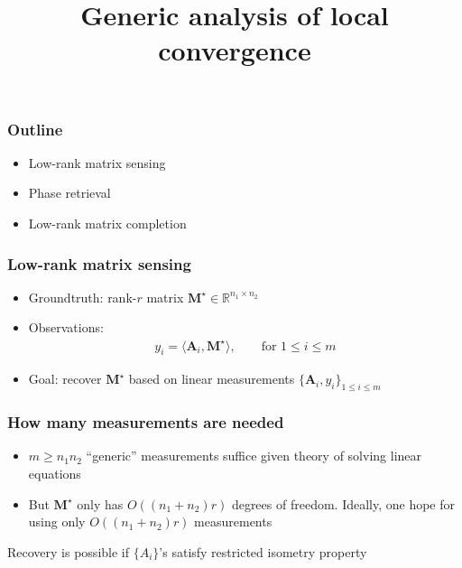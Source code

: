 \documentclass[compress,
mathserif,wide,%
]{beamer}
\title %
{Generic analysis of local convergence}
\begin{document}
\begin{frame}[plain]
  \titlepage

\end{frame}

\begin{frame}
	\frametitle{Outline}
	\begin{itemize}
		\item Low-rank matrix sensing
		\item Phase retrieval
		\item Low-rank matrix completion
	\end{itemize}
\end{frame}

\begin{frame}
	\frametitle{Low-rank matrix sensing}
	\begin{itemize}
		\item Groundtruth: rank-$r$ matrix $\bm{M}^\star \in \mathbb{R}^{n_1 \times n_2}$
		\item Observations:
			\begin{align*}
				 y_{i} = \langle \bm{A}_i, \bm{M}^\star \rangle, \qquad \text{for } 1 \leq i \leq m
			\end{align*}
		\item Goal: recover $\bm{M}^\star$ based on linear measurements $\{ \bm{A}_i, y_i\}_{ 1 \leq i \leq m}$
	\end{itemize}
\end{frame}

\begin{frame}
	\frametitle{How many measurements are needed}
	\begin{itemize}
		\item $m \geq n_1 n_2$ ``generic'' measurements suffice given theory of solving linear equations
		\item But $\bm{M}^{\star}$ only has $O((n_1 + n_2)r)$ degrees of freedom. Ideally, one hope for using only $O((n_1 + n_2)r)$ measurements
	\end{itemize}

\vfill
	{

\begin{varblock}[\textwidth]{}
\centering
Recovery is possible if $\{A_i\}$'s satisfy restricted isometry property
\end{varblock}
}

\end{frame}
\end{document}
